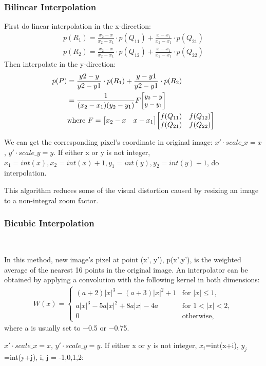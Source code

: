 \documentclass[journal,conference]{IEEEtran}
\begin{document}
\subsubsection{Bilinear Interpolation}
\par First do linear interpolation in the x-direction:
\begin{align*}
p(R_1) = \frac{x_2-x}{x_2-x_1}\cdot p(Q_{11})+\frac{x-x_1}{x_2-x_1}\cdot p(Q_{21})\\
p(R_2) = \frac{x_2-x}{x_2-x_1}\cdot p(Q_{12})+\frac{x-x_1}{x_2-x_1}\cdot p(Q_{22})
\end{align*}
Then interpolate in the y-direction:
\begin{align*}
p(P) &= \frac{y2-y}{y2-y1}\cdot p(R_1)+\frac{y-y1}{y2-y1}\cdot p(R_2)\\ &=\small{\frac {1}{(x_{2}-x_{1})(y_{2}-y_{1})}} F {\begin{bmatrix}y_{2}-y\\y-y_{1}\end{bmatrix}} \\
& \text{where } F = {\begin{bmatrix}x_{2}-x&x-x_{1}\end{bmatrix}}{\begin{bmatrix}f(Q_{11})&f(Q_{12})\\f(Q_{21})&f(Q_{22})\end{bmatrix}}
\end{align*}
\par We can get the corresponding pixel's coordinate in original image: $x'\cdot scale\_x=x$, $y'\cdot scale\_y=y$. If either x or y is not integer, $x_1=int(x),x_2=int(x)+1,y_1=int(y), y_2=int(y)+1$, do interpolation.
\par This algorithm reduces some of the visual distortion caused by resizing an image to a non-integral zoom factor.
~\\
\subsubsection{Bicubic Interpolation}
~\\
\par In this method, new image’s pixel at point (x', y'), p(x',y'), is the weighted average of the nearest 16 points in the original image. An interpolator can be obtained by applying a convolution with the following kernel in both dimensions:
\begin{align*}
{\displaystyle W(x)={\begin{cases}(a+2)|x|^{3}-(a+3)|x|^{2}+1&{\text{for }}|x|\leq 1,\\a|x|^{3}-5a|x|^{2}+8a|x|-4a&{\text{for }}1<|x|<2,\\0&{\text{otherwise}},\end{cases}}}
\end{align*}
where a is usually set to −0.5 or −0.75.
\par $x'\cdot scale\_x=x$, $y'\cdot scale\_y=y$. If either x or y is not integer, $x_i$=int(x+i), $y_j$=int(y+j), i, j = -1,0,1,2:
\end{document}
